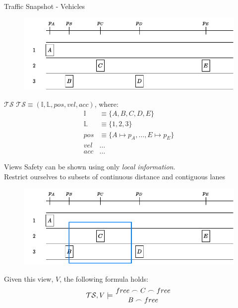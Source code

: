 \documentclass[xcolor=table]{beamer}
\begin{document}
\begin{frame}{Traffic Snapshot - Vehicles}
\begin{figure}[h]
	\centering
	\includegraphics[width=0.7 \textwidth]{../figs/MLSL_simple}
\end{figure}
\pause
\begin{block}{$\mathcal{TS}$}
	$\mathcal{TS} \equiv (\mathbb{I}, \mathbb{L}, pos, vel, acc)$, where:
	\begin{align*}
	\mathbb{I} &\equiv \{A, B, C, D, E\}\\
	\mathbb{L} &\equiv \{1, 2, 3\}\\
	pos &\equiv \{A \mapsto p_A, \ldots, E \mapsto p_E \}\\
	vel &\ldots\\
	acc &\ldots
	\end{align*}
\end{block}




\end{frame}

\begin{frame}{Views}
Safety can be shown using only\textit{ local information}.\\
\bigskip
Restrict ourselves to subsets of continuous distance and contiguous lanes
\pause
\begin{figure}[h]
	\centering
	\includegraphics[width=0.7 \textwidth]{../figs/MLSL_simple_view}
\end{figure}

\pause
Given this view, $V$, the following formula holds:
\begin{equation*}
\mathcal{TS}, V \models \genfrac{}{}{0pt}{}{free\frown C \frown free}{B \frown free}
\end{equation*}

\end{frame}
\end{document}
